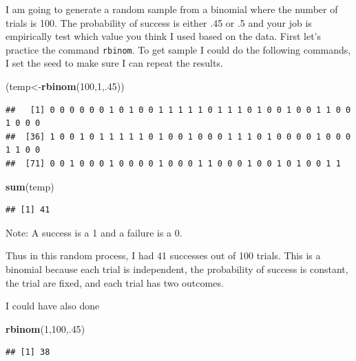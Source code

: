 \documentclass[]{book}
\newenvironment{Shaded}{\begin{snugshade}}{\end{snugshade}}
\newcommand{\KeywordTok}[1]{\textcolor[rgb]{0.13,0.29,0.53}{\textbf{#1}}}
\newcommand{\DecValTok}[1]{\textcolor[rgb]{0.00,0.00,0.81}{#1}}
\newcommand{\NormalTok}[1]{#1}
\theoremstyle{definition}
\theoremstyle{definition}
\theoremstyle{definition}
\theoremstyle{remark}
\begin{document}
I am going to generate a random sample from a binomial where the number
of trials is 100. The probability of success is either .45 or .5 and
your job is empirically test which value you think I used based on the
data. First let's practice the command \texttt{rbinom}. To get sample I
could do the following commands, I set the seed to make sure I can
repeat the results.

\begin{Shaded}
\begin{Highlighting}[]
\NormalTok{(temp<-}\KeywordTok{rbinom}\NormalTok{(}\DecValTok{100}\NormalTok{,}\DecValTok{1}\NormalTok{,.}\DecValTok{45}\NormalTok{))}
\end{Highlighting}
\end{Shaded}

\begin{verbatim}
##   [1] 0 0 0 0 0 0 1 0 1 0 0 1 1 1 1 1 0 1 1 1 0 1 0 0 1 0 0 1 1 0 0 1 0 0 0
##  [36] 1 0 0 1 0 1 1 1 1 1 0 1 0 0 1 0 0 0 1 1 1 0 1 0 0 0 0 1 0 0 0 1 1 0 0
##  [71] 0 0 1 0 0 0 1 0 0 0 0 1 0 0 0 1 1 0 0 0 1 0 0 1 0 1 0 0 1 1
\end{verbatim}

\begin{Shaded}
\begin{Highlighting}[]
\KeywordTok{sum}\NormalTok{(temp)}
\end{Highlighting}
\end{Shaded}

\begin{verbatim}
## [1] 41
\end{verbatim}

Note: A success is a 1 and a failure is a 0.

Thus in this random process, I had 41 successes out of 100 trials. This
is a binomial because each trial is independent, the probability of
success is constant, the trial are fixed, and each trial has two
outcomes.

I could have also done

\begin{Shaded}
\begin{Highlighting}[]
\KeywordTok{rbinom}\NormalTok{(}\DecValTok{1}\NormalTok{,}\DecValTok{100}\NormalTok{,.}\DecValTok{45}\NormalTok{)}
\end{Highlighting}
\end{Shaded}

\begin{verbatim}
## [1] 38
\end{verbatim}
\end{document}
